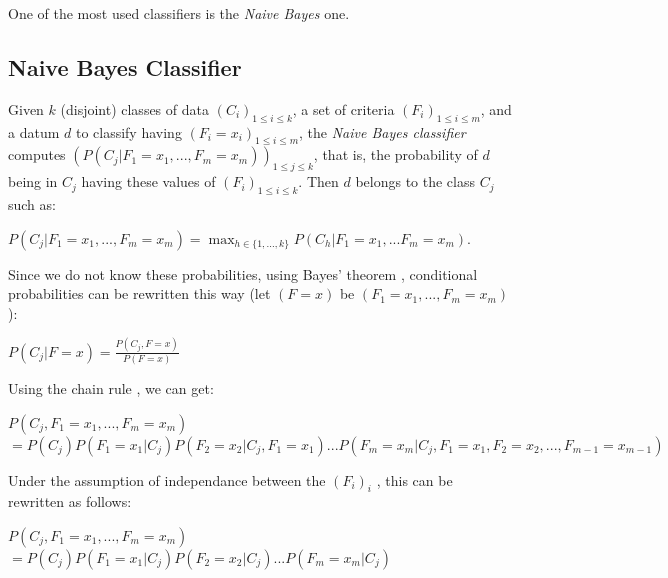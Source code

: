 \documentclass{report}
\begin{document}
One of the most used classifiers is the \emph{Naive Bayes} one.

\subsection{Naive Bayes Classifier}

Given $k$ (disjoint) classes of data $(C_{i})_{1 \le i \le k}$, a set of criteria $(F_{i})_{1 \le i \le m}$, and a datum $d$ to classify having $(F_{i} = x_{i})_{1 \le i \le m}$, the \emph{Naive Bayes classifier} \cite{NaiveBayes} computes $(P(C_{j} | F_{1} = x_{1},...,F_{m} = x_{m}))_{1 \le j \le k}$, that is, the probability of $d$ being in $C_{j}$ having these values of $(F_{i})_{1 \le i \le k}$. Then $d$ belongs to the class $C_{j}$ such as:\\

\begin{center}
$P(C_{j} | F_{1} = x_{1}, ..., F_{m} = x_{m}) = \max_{h \in \{ 1, ..., k \}}P(C_{h} | F_{1} = x_{1}, ... F_{m} = x_{m})$.\\
\end{center}

Since we do not know these probabilities, using Bayes' theorem \cite{NaiveBayes}, conditional probabilities can be rewritten this way (let $(F = x)$ be $(F_{1} = x_{1}, ..., F_{m} = x_{m})$):\\

\begin{center}
$P(C_{j} | F = x) = \frac{P(C_{j},F = x)}{P(F = x)}$\\ 
\end{center}

Using the chain rule \cite{NaiveBayes}, we can get:\\

\begin{center}
$P(C_{j},F_{1} = x_{1}, ..., F_{m} = x_{m})$\\ 
$= P(C_{j})P(F_{1} = x_{1} | C_{j})P(F_{2} = x_{2} | C_{j}, F_{1} = x_{1}) ... P(F_{m} = x_{m} | C_{j}, F_{1} = x_{1}, F_{2} = x_{2}, ..., F_{m-1} = x_{m-1})$\\
\end{center}

Under the assumption of independance between the $(F_{i})_{i}$ \cite{NaiveBayes}, this can be rewritten as follows:\\

\begin{center}
$P(C_{j},F_{1} = x_{1}, ..., F_{m} = x_{m})$\\ 
$= P(C_{j})P(F_{1} = x_{1} | C_{j})P(F_{2} = x_{2} | C_{j}) ... P(F_{m} = x_{m} | C_{j})$\\
\end{center}
\end{document}

